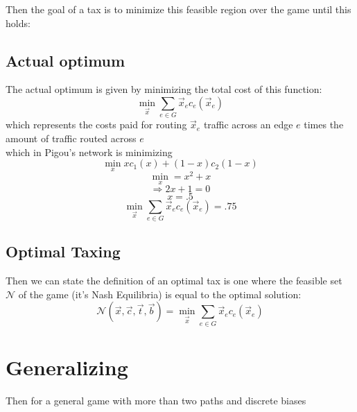 \documentclass[12pt]{article}
\begin{document}
 Then the goal of a tax is to minimize this feasible region over the game until this holds:
 \subsection{Actual optimum}
 The actual optimum is given by minimizing the total cost of this function: \[\min_{\vec x} \sum_{e \in G} \vec x_e c_e(\vec x_e)\] which represents the costs paid for routing $\vec x_e$ traffic across an edge $e$ times the amount of traffic routed across $e$\\ which in Pigou's network is minimizing \[\min_x x c_1(x) + (1-x)c_2(1-x)\]
 \[\min_x = x^2 + x\]
 \[\Rightarrow 2x +1 =0\]
 \[x = .5\]
 \[ \min_{\vec x} \sum_{e \in G} \vec x_e c_e(\vec x_e) = .75 \] 
 
 \subsection{Optimal Taxing}
Then we can state the definition of an optimal tax is one where
the feasible set $\mathcal N$ of the game (it's Nash Equilibria)  is equal to the optimal solution:
\[ \mathcal N(\vec x, \vec c, \vec t, \vec b) = \min_{\vec x} \sum_{e \in G}  \vec x_e c_e(\vec x_e) \]

 \section{Generalizing}
 Then for a general game with more than two paths and discrete biases 
\end{document}
